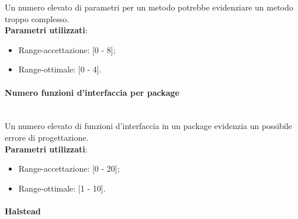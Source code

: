 			Un numero elevato di parametri per un metodo potrebbe evidenziare un metodo troppo complesso.\\
			\textbf{Parametri utilizzati}:
			\begin{itemize}
				\item Range-accettazione: [0 - 8];
				\item Range-ottimale: [0 - 4].
			\end{itemize}
			
			
			\paragraph{Numero funzioni d'interfaccia per package}\mbox{} \\
				
			Un numero elevato di funzioni d'interfaccia in un package evidenzia un possibile errore di progettazione.\\
			\textbf{Parametri utilizzati}:
			\begin{itemize}
				\item Range-accettazione: [0 - 20];
				\item Range-ottimale: [1 - 10].
			\end{itemize}

			
			\paragraph{Halstead}\mbox{} \\
			

